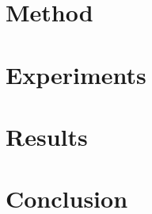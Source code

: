 \documentclass[12pt,oneside,a4paper,english]{abntex2}
\begin{document}
\lipsum[2]

\section{Method}
\label{sec:orgd5b048e}

\lipsum[3]

\section{Experiments}
\label{sec:org86b1e28}

\lipsum[4]

\section{Results}
\label{sec:orgca70ec6}

\lipsum[5]

\section{Conclusion}
\label{sec:org0457332}

\lipsum[6]
\end{document}
